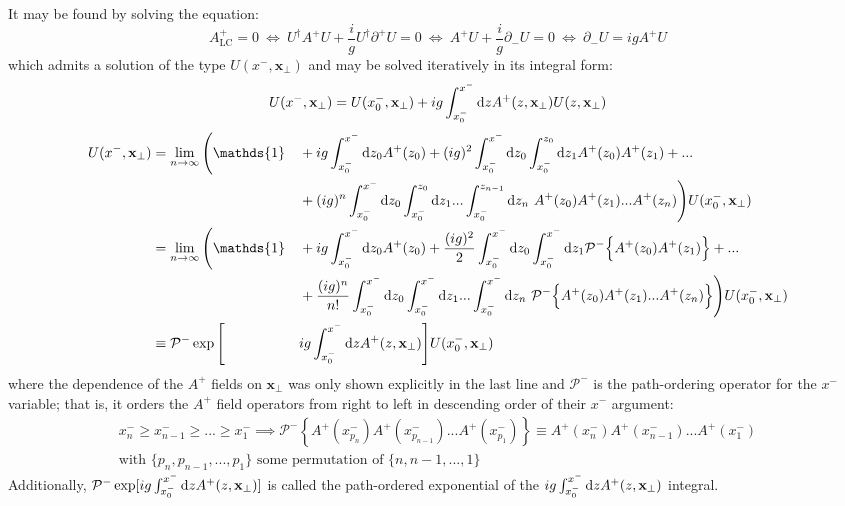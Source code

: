 It may be found by solving the equation:
\begin{equation}
	A_{\text{LC}}^{+}=0 ~ \Leftrightarrow ~ U^\dagger A^+ U + \frac{i}{g} U^\dagger \partial^+ U = 0 ~ \Leftrightarrow ~ A^+ U + \frac{i}{g} \partial_- U = 0 ~ \Leftrightarrow ~ \partial_- U = ig A^+ U
\end{equation}
which admits a solution of the type $U(x^-,\mathbf{x}_\perp)$ and may be solved iteratively in its integral form:
\begin{gather}
	U(x^-,\mathbf{x}_\perp) = U(x^-_0, \mathbf{x}_\perp) + ig \int_{x^-_0}^{x^-} \mathop{}\!\mathrm{d} z A^+ (z, \mathbf{x}_\perp) U (z, \mathbf{x}_\perp)
\end{gather}
\begin{alignat}{2}
	U(x^-,\mathbf{x}_\perp) & = \lim_{n \to \infty} \Bigg( \mathds{1} 
	 && + ig\int_{x_0^-}^{x^-}  \diff z_0 A^+ (z_0) 
	+ (ig)^2\int_{x_0^-}^{x^-} \diff z_0 \int_{x_0^-}^{z_0} \diff z_1 A^+ (z_0) A^+ (z_1) + ... \nonumber \\ 
	& && + (ig)^n\int_{x_0^-}^{x^-} \diff z_0  \int_{x_0^-}^{z_0} \diff z_1 ...  \int_{x_0^-}^{z_{n-1}} \diff z_n ~ A^+ (z_0) A^+ (z_1) ...  A^+ (z_n)
	 \Bigg) U(x_0^-,\mathbf{x}_\perp) \nonumber \\
	 & = \lim_{n \to \infty} \Bigg( \mathds{1} 
	 && + ig\int_{x_0^-}^{x^-}  \diff z_0 A^+ (z_0) 
	+ \frac{(ig)^2}{2} \int_{x_0^-}^{x^-} \diff z_0 \int_{x_0^-}^{x^-} \diff z_1  \mathcal{P}^- \Big \{ A^+ (z_0) A^+ (z_1) \Big \} + ... \nonumber \\ 
	& && + \frac{(ig)^n}{n!}\int_{x_0^-}^{x^-} \diff z_0  \int_{x_0^-}^{x^-} \diff z_1 ...  \int_{x_0^-}^{x^-} \diff z_n ~ \mathcal{P}^- \Big \{ A^+ (z_0) A^+ (z_1) ...  A^+ (z_n) \Big \}
	 \Bigg) U(x_0^-,\mathbf{x}_\perp) \nonumber \\
	 & \equiv \mathcal{P}^- \exp  \Bigg[&& ig \int_{x^-_0}^{x^-} \diff z A^+ (z, \mathbf{x}_\perp) \Bigg] U(x_0^-,\mathbf{x}_\perp)
\end{alignat}
where the dependence of the $A^+$ fields on $\mathbf{x}_\perp$ was only shown explicitly in the last line and $\mathcal{P}^-$ is the path-ordering operator for the $x^-$ variable; that is, it orders the $A^+$ field operators from right to left in descending order of their $x^-$ argument:
\begin{gather}
	x^-_n \geq x^-_{n-1} \geq ... \geq x_1^- \implies \mathcal{P}^- \left \{A^+(x^-_{p_n}) A^+(x^-_{p_{n-1}}) ... A^+(x_{p_1}^-) \right \} \equiv A^+(x^-_n) A^+(x^-_{n-1}) ... A^+(x_1^-) \\
	\text{with $\{p_n, p_{n-1}, ..., p_1\}$ some permutation of $\{n, n-1, ..., 1\}$} \nonumber
\end{gather}
Additionally,  $\mathcal{P}^-\exp[ig\int_{x^-_0}^{x^-} \mathop{}\!\mathrm{d} z A^+ (z, \mathbf{x}_\perp)]$ is called the path-ordered exponential of the $ig\int_{x^-_0}^{x^-} \mathop{}\!\mathrm{d} z A^+ (z, \mathbf{x}_\perp)$ integral.

